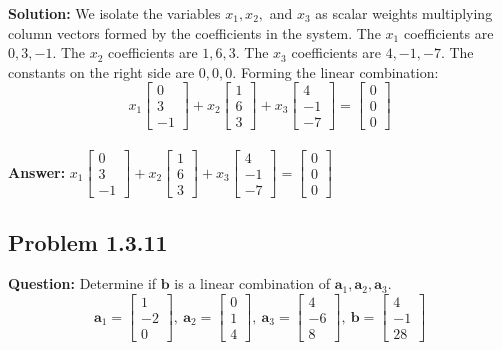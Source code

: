 \documentclass[11pt]{article}
\begin{document}
\textbf{Solution:}
We isolate the variables $x_1, x_2,$ and $x_3$ as scalar weights multiplying column vectors formed by the coefficients in the system.
The $x_1$ coefficients are $0, 3, -1$.
The $x_2$ coefficients are $1, 6, 3$.
The $x_3$ coefficients are $4, -1, -7$.
The constants on the right side are $0, 0, 0$.
Forming the linear combination:
\[ x_1 \begin{bmatrix} 0 \\ 3 \\ -1 \end{bmatrix} + x_2 \begin{bmatrix} 1 \\ 6 \\ 3 \end{bmatrix} + x_3 \begin{bmatrix} 4 \\ -1 \\ -7 \end{bmatrix} = \begin{bmatrix} 0 \\ 0 \\ 0 \end{bmatrix} \]
\\
\textbf{Answer:} $x_1 \begin{bmatrix} 0 \\ 3 \\ -1 \end{bmatrix} + x_2 \begin{bmatrix} 1 \\ 6 \\ 3 \end{bmatrix} + x_3 \begin{bmatrix} 4 \\ -1 \\ -7 \end{bmatrix} = \begin{bmatrix} 0 \\ 0 \\ 0 \end{bmatrix}$


\subsection*{Problem 1.3.11}
\textbf{Question:} Determine if $\mathbf{b}$ is a linear combination of $\mathbf{a}_1, \mathbf{a}_2, \mathbf{a}_3$.
\[ \mathbf{a}_1 = \begin{bmatrix} 1 \\ -2 \\ 0 \end{bmatrix}, \ \mathbf{a}_2 = \begin{bmatrix} 0 \\ 1 \\ 4 \end{bmatrix}, \ \mathbf{a}_3 = \begin{bmatrix} 4 \\ -6 \\ 8 \end{bmatrix}, \ \mathbf{b} = \begin{bmatrix} 4 \\ -1 \\ 28 \end{bmatrix} \]
\end{document}
